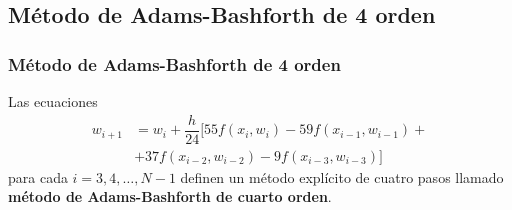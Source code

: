 \subsection{Método de Adams-Bashforth de 4 orden}
\begin{frame}
\frametitle{Método de Adams-Bashforth de 4 orden}
Las ecuaciones
\[ \begin{split}
w_{i+1} &= w_{i} + \dfrac{h}{24} [ 55 f(x_{i},w_{i}) - 59 f(x_{i-1},w_{i-1}) + \\
&+ 37 f(x_{i-2},w_{i-2}) - 9 f(x_{i-3},w_{i-3}) ]
\end{split} \]
para cada $i=3,4,\ldots, N-1$ definen un método explícito de cuatro pasos llamado \textbf{método de Adams-Bashforth de cuarto orden}.
\end{frame}
